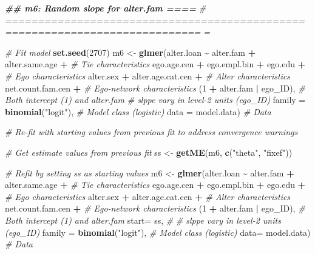 \documentclass[
]{book}
\newenvironment{Shaded}{\begin{snugshade}}{\end{snugshade}}
\newcommand{\AttributeTok}[1]{\textcolor[rgb]{0.13,0.29,0.53}{#1}}
\newcommand{\CommentTok}[1]{\textcolor[rgb]{0.56,0.35,0.01}{\textit{#1}}}
\newcommand{\DecValTok}[1]{\textcolor[rgb]{0.00,0.00,0.81}{#1}}
\newcommand{\DocumentationTok}[1]{\textcolor[rgb]{0.56,0.35,0.01}{\textbf{\textit{#1}}}}
\newcommand{\FunctionTok}[1]{\textcolor[rgb]{0.13,0.29,0.53}{\textbf{#1}}}
\newcommand{\NormalTok}[1]{#1}
\newcommand{\OtherTok}[1]{\textcolor[rgb]{0.56,0.35,0.01}{#1}}
\newcommand{\SpecialCharTok}[1]{\textcolor[rgb]{0.81,0.36,0.00}{\textbf{#1}}}
\newcommand{\StringTok}[1]{\textcolor[rgb]{0.31,0.60,0.02}{#1}}
\begin{document}
\begin{Shaded}
\begin{Highlighting}[]
\DocumentationTok{\#\# m6: Random slope for alter.fam                                           ====}
\CommentTok{\# ============================================================================ =}

\CommentTok{\# Fit model}
\FunctionTok{set.seed}\NormalTok{(}\DecValTok{2707}\NormalTok{)}
\NormalTok{m6 }\OtherTok{\textless{}{-}} \FunctionTok{glmer}\NormalTok{(alter.loan }\SpecialCharTok{\textasciitilde{}}\NormalTok{ alter.fam }\SpecialCharTok{+}\NormalTok{ alter.same.age }\SpecialCharTok{+} \CommentTok{\# Tie characteristics}
\NormalTok{              ego.age.cen }\SpecialCharTok{+}\NormalTok{ ego.empl.bin }\SpecialCharTok{+}\NormalTok{ ego.edu }\SpecialCharTok{+} \CommentTok{\# Ego characteristics}
\NormalTok{              alter.sex }\SpecialCharTok{+}\NormalTok{ alter.age.cat.cen }\SpecialCharTok{+}  \CommentTok{\# Alter characteristics}
\NormalTok{              net.count.fam.cen }\SpecialCharTok{+} \CommentTok{\# Ego{-}network characteristics}
\NormalTok{              (}\DecValTok{1} \SpecialCharTok{+}\NormalTok{ alter.fam }\SpecialCharTok{|}\NormalTok{ ego\_ID), }\CommentTok{\# Both intercept (1) and alter.fam }
            \CommentTok{\# slppe vary in level{-}2 units (ego\_ID)}
            \AttributeTok{family =} \FunctionTok{binomial}\NormalTok{(}\StringTok{"logit"}\NormalTok{), }\CommentTok{\# Model class (logistic)}
            \AttributeTok{data =}\NormalTok{ model.data) }\CommentTok{\# Data}

\CommentTok{\# Re{-}fit with starting values from previous fit to address convergence warnings}

\CommentTok{\# Get estimate values from previous fit}
\NormalTok{ss }\OtherTok{\textless{}{-}} \FunctionTok{getME}\NormalTok{(m6, }\FunctionTok{c}\NormalTok{(}\StringTok{"theta"}\NormalTok{, }\StringTok{"fixef"}\NormalTok{))}

\CommentTok{\# Refit by setting ss as starting values }
\NormalTok{m6 }\OtherTok{\textless{}{-}} \FunctionTok{glmer}\NormalTok{(alter.loan }\SpecialCharTok{\textasciitilde{}}\NormalTok{ alter.fam }\SpecialCharTok{+}\NormalTok{ alter.same.age }\SpecialCharTok{+} \CommentTok{\# Tie characteristics}
\NormalTok{              ego.age.cen }\SpecialCharTok{+}\NormalTok{ ego.empl.bin }\SpecialCharTok{+}\NormalTok{ ego.edu }\SpecialCharTok{+} \CommentTok{\# Ego characteristics}
\NormalTok{              alter.sex }\SpecialCharTok{+}\NormalTok{ alter.age.cat.cen }\SpecialCharTok{+}  \CommentTok{\# Alter characteristics}
\NormalTok{              net.count.fam.cen }\SpecialCharTok{+} \CommentTok{\# Ego{-}network characteristics}
\NormalTok{              (}\DecValTok{1} \SpecialCharTok{+}\NormalTok{ alter.fam }\SpecialCharTok{|}\NormalTok{ ego\_ID), }\CommentTok{\# Both intercept (1) and alter.fam }
            \AttributeTok{start=}\NormalTok{ ss, }\CommentTok{\# }
            \CommentTok{\# slppe vary in level{-}2 units (ego\_ID)}
            \AttributeTok{family =} \FunctionTok{binomial}\NormalTok{(}\StringTok{"logit"}\NormalTok{), }\CommentTok{\# Model class (logistic)}
            \AttributeTok{data=}\NormalTok{ model.data) }\CommentTok{\# Data}


\end{Highlighting}
\end{Shaded}
\end{document}
